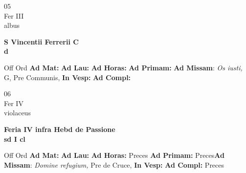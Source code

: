 \documentclass[10pt, openany]{book}
\begin{document}
    \begin{center}
        \begin{minipage}{3.5in}
            \vspace{2em}
            \begin{minipage}{0.5in}
                {\Huge 05} \\
                {\normalsize Fer III} \\
                {\normalsize albus}
            \end{minipage}
            \begin{minipage}{3.0in}
                \textbf{ \large S Vincentii Ferrerii C \\
                \textnormal{\normalsize d}} \\ 
            \end{minipage}
            \begin{justify}Off Ord
                \textbf{Ad Mat: }
                \textbf{Ad Lau: }
                \textbf{Ad Horas: }
                \textbf{Ad Primam: }\textbf{Ad Missam}: \textit{Os iusti,} G, Pre Communis,  
                \textbf{In Vesp: }
                \textbf{Ad Compl: }
            \end{justify}
        \end{minipage}
    \end{center}

    \begin{center}
        \begin{minipage}{3.5in}
            \vspace{2em}
            \begin{minipage}{0.5in}
                {\Huge 06} \\
                {\normalsize Fer IV} \\
                {\normalsize violaceus}
            \end{minipage}
            \begin{minipage}{3.0in}
                \textbf{ \large Feria IV infra Hebd de Passione \\
                \textnormal{\normalsize sd I cl}} \\ 
            \end{minipage}
            \begin{justify}Off Ord
                \textbf{Ad Mat: }
                \textbf{Ad Lau: }
                \textbf{Ad Horas: }Preces
                \textbf{Ad Primam: }Preces\textbf{Ad Missam}: \textit{Domine refugium,} Pre de Cruce,  
                \textbf{In Vesp: }
                \textbf{Ad Compl: }Preces
            \end{justify}
        \end{minipage}
    \end{center}
\end{document}
